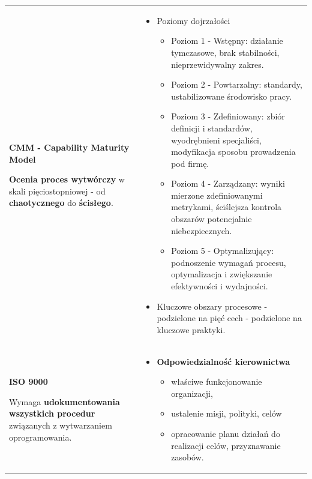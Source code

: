 \documentclass[a4paper]{article}
\begin{document}
    \begin{table}[H]
        \begin{center}
            \begin{tabular}{ p{7cm} | p{9cm}  }

                \textbf{CMM - Capability Maturity Model}

                \textbf{Ocenia proces wytwórczy} w skali pięciostopniowej - od \textbf{chaotycznego} do \textbf{ścisłego}.
                &
                \begin{itemize}
                    \item Poziomy dojrzałości
                    \begin{itemize}
                        \item Poziom 1 - Wstępny: działanie tymczasowe, brak stabilności, nieprzewidywalny zakres.
                        \item Poziom 2 - Powtarzalny: standardy, ustabilizowane środowisko pracy.
                        \item Poziom 3 - Zdefiniowany: zbiór definicji i standardów, wyodrębnieni specjaliści, modyfikacja sposobu prowadzenia pod firmę.
                        \item Poziom 4 - Zarządzany: wyniki mierzone zdefiniowanymi metrykami, ściślejsza kontrola obszarów potencjalnie niebezpiecznych.
                        \item Poziom 5 - Optymalizujący: podnoszenie wymagań procesu, optymalizacja i zwiększanie efektywności i wydajności.
                    \end{itemize}

                    \item Kluczowe obszary procesowe - podzielone na pięć cech - podzielone na kluczowe praktyki.
                \end{itemize}
                \\

                \cmidrule(r){1-1}\cmidrule(l){2-2}

                \textbf{ISO 9000}

                Wymaga \textbf{udokumentowania wszystkich procedur} związanych z wytwarzaniem oprogramowania.
                &
                \begin{itemize}
                    \item \textbf{Odpowiedzialność kierownictwa}
                    \begin{itemize}
                        \item właściwe funkcjonowanie organizacji,
                        \item ustalenie misji, polityki, celów
                        \item opracowanie planu działań do realizacji celów, przyznawanie zasobów.
                    \end{itemize}


\end{itemize}
\end{tabular}
\end{center}
\end{table}
\end{document}
